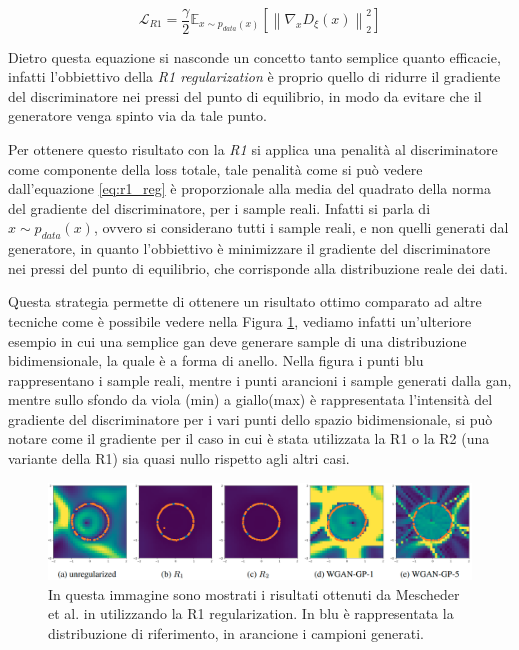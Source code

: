\begin{equation}
    \label{eq:r1_reg}
    \mathcal{L}_{R1} = \frac{\gamma}{2} \mathbb{E}_{x \sim p_{data}(x)} \left[ \left\| \nabla_{x} D_{\xi}(x) \right\|_{2}^{2} \right]
\end{equation}

Dietro questa equazione si nasconde un concetto tanto semplice quanto efficacie, infatti l'obbiettivo della \textit{R1 regularization}
è proprio quello di ridurre il gradiente del discriminatore nei pressi del punto di equilibrio, in modo da evitare che il generatore
venga spinto via da tale punto.

Per ottenere questo risultato con la \textit{R1} si applica una penalità al discriminatore come componente della loss totale, tale penalità come si
può vedere dall'equazione \ref{eq:r1_reg} è proporzionale alla media del quadrato della norma del gradiente del discriminatore, per i sample reali.
Infatti si parla di $x \sim p_{data}(x)$, ovvero si considerano tutti i sample reali, e non quelli generati dal generatore, in quanto l'obbiettivo
è minimizzare il gradiente del discriminatore nei pressi del punto di equilibrio, che corrisponde alla distribuzione reale dei dati.

Questa strategia permette di ottenere un risultato ottimo comparato ad altre tecniche come è possibile vedere nella Figura \ref{fig:r1_reg},
vediamo infatti un'ulteriore esempio in cui una semplice gan deve generare sample di una distribuzione bidimensionale, la quale è a 
forma di anello. Nella figura i punti blu rappresentano i sample reali, mentre i punti arancioni i sample generati dalla gan, 
mentre sullo sfondo da viola (min) a giallo(max) è rappresentata l'intensità del gradiente del discriminatore per i vari punti 
dello spazio bidimensionale, si può notare come il gradiente per il caso in cui è stata utilizzata la R1 o la R2 
(una variante della R1) sia quasi nullo rispetto agli altri casi.

    \begin{figure}[H]
        \centering
        \includegraphics[width=1.0\textwidth]{imgs/r1_reg.png}
        \caption{In questa immagine sono mostrati i risultati ottenuti da Mescheder et al. in \cite{mescheder2018training} 
            utilizzando la R1 regularization. In blu è rappresentata la distribuzione di riferimento, in arancione i campioni generati.}
        \label{fig:r1_reg}
    \end{figure}

